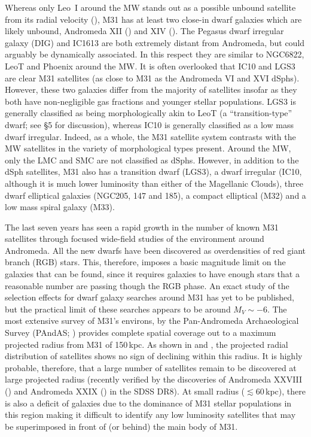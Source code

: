 \documentclass[manuscript]{aastex}
\begin{document}
Whereas only Leo~I around the MW stands out as a possible unbound
satellite from its radial velocity (\citealt{mateo2008}), M31 has at
least two close-in dwarf galaxies which are likely unbound, Andromeda
XII (\citealt{chapman2007}) and XIV (\citealt{majewski2007}). The
Pegasus dwarf irregular galaxy (DIG) and IC1613 are both extremely
distant from Andromeda, but could arguably be dynamically
associated. In this respect they are similar to NGC6822, LeoT and
Phoenix around the MW. It is often overlooked that IC10 and LGS3 are
clear M31 satellites (as close to M31 as the Andromeda VI and XVI
dSphs). However, these two galaxies differ from the majority of
satellites insofar as they both have non-negligible gas fractions and
younger stellar populations. LGS3 is generally classified as being
morphologically akin to LeoT (a ``transition-type'' dwarf; see \S5 for
discussion), whereas IC10 is generally classified as a low mass dwarf
irregular. Indeed, as a whole, the M31 satellite system contrasts with
the MW satellites in the variety of morphological types present.
Around the MW, only the LMC and SMC are not classified as
dSphs. However, in addition to the dSph satellites, M31 also has a
transition dwarf (LGS3), a dwarf irregular (IC10, although it is much
lower luminosity than either of the Magellanic Clouds), three dwarf
elliptical galaxies (NGC205, 147 and 185), a compact elliptical (M32)
and a low mass spiral galaxy (M33).

The last seven years has seen a rapid growth in the number of known M31
satellites through focused wide-field studies of the environment
around Andromeda. All the new dwarfs have been discovered as
overdensities of red giant branch (RGB) stars. This, therefore,
imposes a basic magnitude limit on the galaxies that can be found,
since it requires galaxies to have enough stars that a reasonable
number are passing though the RGB phase. An exact study of the
selection effects for dwarf galaxy searches around M31 has yet to be
published, but the practical limit of these searches appears to be
around $M_V \sim -6$.  The most extensive survey of M31's environs, by
the Pan-Andromeda Archaeological Survey (PAndAS;
\citealt{mcconnachie2009b}) provides complete spatial coverage out to
a maximum projected radius from M31 of 150\,kpc. As shown in
\cite{mcconnachie2009b} and \cite{richardson2011}, the projected
radial distribution of satellites shows no sign of declining within
this radius. It is highly probable, therefore, that a large number of
satellites remain to be discovered at large projected radius (recently verified
by the discoveries of Andromeda XXVIII (\citealt{slater2011}) and
Andromeda XXIX
(\citealt{bell2011}) in the SDSS DR8). At small radius ($\lesssim
60$\,kpc), there is also a deficit of galaxies due to the dominance
of M31 stellar populations in this region making it difficult to
identify any low luminosity satellites that may be superimposed in
front of (or behind) the main body of M31.
\end{document}
